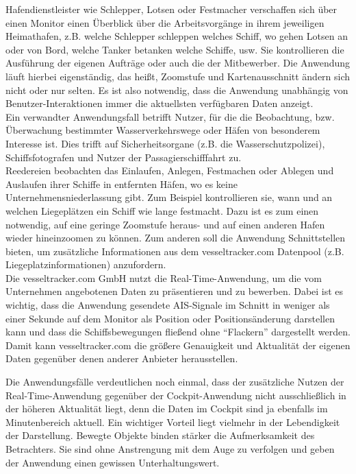 Hafendienstleister wie Schlepper, Lotsen oder Festmacher verschaffen sich über einen Monitor einen Überblick über die Arbeitsvorgänge in ihrem jeweiligen Heimathafen, z.B. welche Schlepper schleppen welches Schiff, wo gehen Lotsen an oder von Bord, welche Tanker betanken welche Schiffe, usw. Sie kontrollieren die Ausführung der eigenen Aufträge oder auch die der Mitbewerber.
Die Anwendung läuft hierbei eigenständig, das heißt, Zoomstufe und Kartenausschnitt ändern sich nicht oder nur selten. Es ist also notwendig, dass die Anwendung unabhängig von Benutzer-Interaktionen immer die aktuellsten verfügbaren Daten anzeigt.\\
Ein verwandter Anwendungsfall betrifft Nutzer, für die die Beobachtung, bzw. Überwachung bestimmter Wasserverkehrswege oder Häfen von besonderem Interesse ist. Dies trifft auf Sicherheitsorgane (z.B. die Wasserschutzpolizei), Schiffsfotografen und Nutzer der Passagierschifffahrt zu.\\
Reedereien beobachten das Einlaufen, Anlegen, Festmachen oder Ablegen und Auslaufen ihrer Schiffe in entfernten Häfen, wo es keine Unternehmensniederlassung gibt. Zum Beispiel kontrollieren sie, wann und an welchen Liegeplätzen ein Schiff wie lange festmacht.
Dazu ist es zum einen notwendig, auf eine geringe Zoomstufe heraus- und auf einen anderen Hafen wieder hineinzoomen zu können. Zum anderen soll die Anwendung Schnittstellen bieten, um zusätzliche Informationen aus dem vesseltracker.com Datenpool (z.B. Liegeplatzinformationen) anzufordern.\\
Die vesseltracker.com GmbH nutzt die Real-Time-Anwendung, um die vom Unternehmen angebotenen Daten zu präsentieren und zu bewerben. Dabei ist es wichtig, dass die Anwendung gesendete AIS-Signale im Schnitt in weniger als einer Sekunde auf dem Monitor als Position oder Positionsänderung darstellen kann und dass die Schiffsbewegungen fließend ohne  “Flackern” dargestellt werden. Damit kann vesseltracker.com die größere Genauigkeit und Aktualität der eigenen Daten gegenüber denen anderer Anbieter herausstellen.

Die Anwendungsfälle verdeutlichen noch einmal, dass der zusätzliche Nutzen der Real-Time-Anwendung gegenüber der Cockpit-Anwendung nicht ausschließlich in der höheren Aktualität liegt, denn die Daten im Cockpit sind ja ebenfalls im Minutenbereich aktuell. Ein wichtiger Vorteil liegt vielmehr in der Lebendigkeit der Darstellung. Bewegte Objekte binden stärker die Aufmerksamkeit des Betrachters. Sie sind ohne Anstrengung mit dem Auge zu verfolgen und geben der Anwendung einen gewissen Unterhaltungswert.
\newpage
